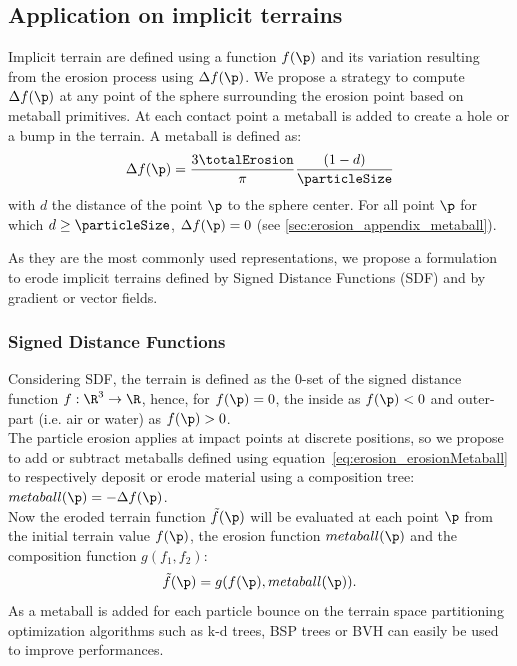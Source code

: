 \subsection{Application on implicit terrains}
\label{sec:erosion_application_on_implicit}
Implicit terrain are defined using a function $f(\p)$ and its variation resulting from the erosion process using $\Delta f(\p)$.
We propose a strategy to compute $\Delta f(\p)$ at any point of the sphere surrounding the erosion point based on metaball primitives. At each contact point a metaball is added to create a hole or a bump in the terrain. A metaball is defined as: 
\begin{align}\label{eq:erosion_erosionMetaball}
\Delta f(\p) = \frac{3 \totalErosion}{\pi} \frac{(1 - d)}{\particleSize}
\end{align}
with $d$ the distance of the point $\p$ to the sphere center. For all point $\p$ for which $d \geq \particleSize$, $\Delta f(\p) = 0$ (see \cref{sec:erosion_appendix_metaball}).

As they are the most commonly used representations, we propose a formulation to erode implicit terrains defined by Signed Distance Functions (SDF) and by gradient or vector fields.

\subsubsection{Signed Distance Functions}
\label{sec:erosion_application_on_sdf}
Considering SDF, the terrain is defined as the 0-set of the signed distance function $f: \R^3 \to \R$, hence, for $f(\p) = 0$, the inside as $f(\p) < 0$ and outer-part (i.e. air or water) as $f(\p) > 0$. \\ 
The particle erosion applies at impact points at discrete positions, so we propose to add or subtract metaballs defined using equation~\eqref{eq:erosion_erosionMetaball} to respectively deposit or erode material using a composition tree:\\ $metaball(\p) = -\Delta f(\p)$.\\
Now the eroded terrain function $\Tilde{f}(\p)$ will be evaluated at each point $\p$ from the initial terrain value $f(\p)$, the erosion function $metaball(\p)$ and the composition function $g(f_1, f_2)$:
\begin{align} \label{eq:erosion_finalMetaball}
\Tilde{f}(\p) = g(f(\p), metaball(\p)).  \nonumber
\end{align}
As a metaball is added for each particle bounce on the terrain space partitioning optimization algorithms such as k-d trees, BSP trees or BVH can easily be used to improve performances.

